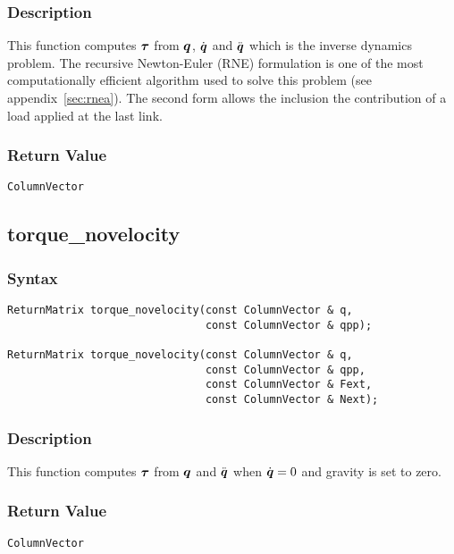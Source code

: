 \documentclass[dvips,11pt,fleqn]{report}
\newcommand{\mbold}[1]{\mbox{\boldmath $ #1 $}}
\begin{document}
\subsubsection*{Description}

This function computes $\mbold{\tau}$ from $\mbold{q}$,
$\dot{\mbold{q}}$ and $\ddot{\mbold{q}}$ which is the inverse dynamics
problem. The recursive Newton-Euler (RNE) formulation is one of the
most computationally efficient algorithm \cite{Luh80,Murray86} used to
solve this problem (see appendix~\ref{sec:rnea}). The second form
allows the inclusion the contribution of a load applied at the last link.


\subsubsection*{Return Value}

{\tt ColumnVector}

\newpage

\subsection*{torque\_novelocity}
\subsubsection*{Syntax}
\begin{verbatim}
ReturnMatrix torque_novelocity(const ColumnVector & q,
                               const ColumnVector & qpp);

ReturnMatrix torque_novelocity(const ColumnVector & q,
                               const ColumnVector & qpp,
                               const ColumnVector & Fext,
                               const ColumnVector & Next);
\end{verbatim}
\subsubsection*{Description}
This function computes $\mbold{\tau}$ from $\mbold{q}$ 
and $\ddot{\mbold{q}}$ when $\dot{\mbold{q}} = 0$ and gravity is set to zero.


\subsubsection*{Return Value}

{\tt ColumnVector}
\end{document}
